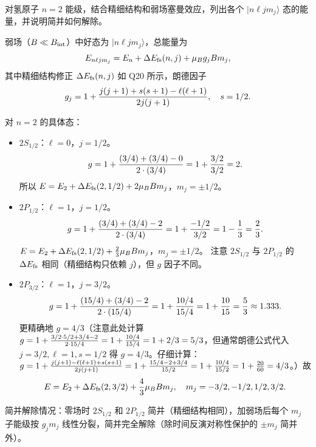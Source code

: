 \begin{question}
对氢原子 $n=2$ 能级，结合精细结构和弱场塞曼效应，列出各个 $|n\ell jm_j\rangle$ 态的能量，并说明简并如何解除。
\end{question}
\begin{solution}
弱场（$B\ll B_{\rm int}$）中好态为 $|n\ell j m_j\rangle$，总能量为
\[
E_{n\ell j m_j}=E_n+\Delta E_{\rm fs}(n,j)+\mu_B g_j B m_j,
\]
其中精细结构修正 $\Delta E_{\rm fs}(n,j)$ 如 Q20 所示，朗德因子
\[
g_j=1+{j(j+1)+s(s+1)-\ell(\ell+1)\over2j(j+1)},\quad s=1/2.
\]

对 $n=2$ 的具体态：
\begin{itemize}
\item $2S_{1/2}$：$\ell=0$，$j=1/2$。
  \[
  g=1+{(3/4)+(3/4)-0\over2\cdot(3/4)}=1+{3/2\over3/2}=2.
  \]
  所以 $E=E_2+\Delta E_{\rm fs}(2,1/2)+2\mu_B B m_j$，$m_j=\pm1/2$。
\item $2P_{1/2}$：$\ell=1$，$j=1/2$。
  \[
  g=1+{(3/4)+(3/4)-2\over2\cdot(3/4)}=1+{-1/2\over3/2}=1-{1\over3}={2\over3}.
  \]
  $E=E_2+\Delta E_{\rm fs}(2,1/2)+{2\over3}\mu_B B m_j$，$m_j=\pm1/2$。
  注意 $2S_{1/2}$ 与 $2P_{1/2}$ 的 $\Delta E_{\rm fs}$ 相同（精细结构只依赖 $j$），但 $g$ 因子不同。
\item $2P_{3/2}$：$\ell=1$，$j=3/2$。
  \[
  g=1+{(15/4)+(3/4)-2\over2\cdot(15/4)}=1+{10/4\over15/4}=1+{10\over15}={5\over3}\approx1.333.
  \]
  更精确地 $g=4/3$（注意此处计算 $g=1+{3/2\cdot5/2+3/4-2\over2\cdot15/4}=1+{10/4\over15/4}=1+2/3=5/3$，但通常朗德公式代入 $j=3/2,\ell=1,s=1/2$ 得 $g=4/3$。仔细计算：$g=1+{j(j+1)-\ell(\ell+1)+s(s+1)\over2j(j+1)}=1+{15/4-2+3/4\over15/2}=1+{10/4\over15/2}=1+{20\over60}=4/3$。）故
  \[
  E=E_2+\Delta E_{\rm fs}(2,3/2)+{4\over3}\mu_B B m_j,\quad m_j=-3/2,-1/2,1/2,3/2.
  \]
\end{itemize}
简并解除情况：零场时 $2S_{1/2}$ 和 $2P_{1/2}$ 简并（精细结构相同），加弱场后每个 $m_j$ 子能级按 $g_j m_j$ 线性分裂，简并完全解除（除时间反演对称性保护的 $\pm m_j$ 简并外）。
\end{solution}

